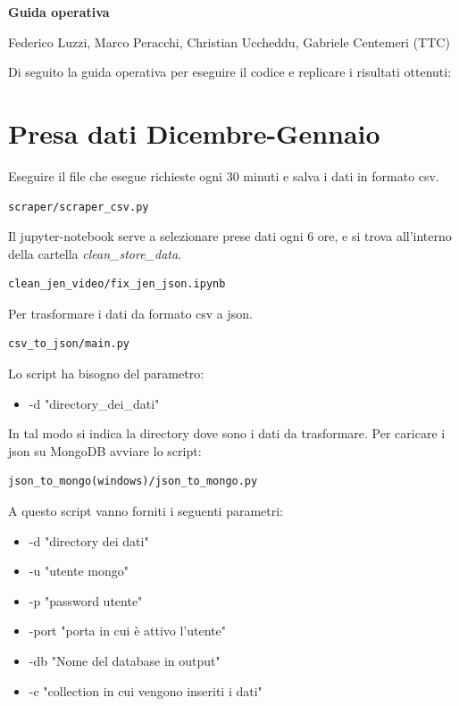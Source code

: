 \documentclass[10pt, a4paper,openany]{article}
\begin{document}
\begin{center}
\large\textbf{Guida operativa}
\end{center}

\begin{center}
 Federico Luzzi,  Marco Peracchi, Christian Uccheddu, Gabriele Centemeri (TTC)
\end{center}
Di seguito la guida operativa per eseguire il codice e replicare i risultati ottenuti:

\section*{Presa dati Dicembre-Gennaio}

Eseguire il file che esegue richieste ogni 30 minuti e salva i dati in formato csv. 

\begin{verbatim}
scraper/scraper_csv.py
\end{verbatim}

Il jupyter-notebook serve a selezionare prese dati ogni 6 ore, e si trova all'interno della cartella \textit{clean\_store\_data}.

\begin{verbatim}
clean_jen_video/fix_jen_json.ipynb
\end{verbatim}

Per trasformare i dati da formato csv a json.

\begin{verbatim}
csv_to_json/main.py
\end{verbatim}

Lo script ha bisogno del parametro:

\begin{itemize}
	\item -d "directory\_dei\_dati"
\end{itemize}

In tal modo si indica la directory dove sono i dati da trasformare.
Per caricare i json su MongoDB avviare lo script:

\begin{verbatim}
json_to_mongo(windows)/json_to_mongo.py
\end{verbatim}

A questo script vanno forniti i seguenti parametri:

\begin{itemize}
	\item -d "directory dei dati"
	\item -u "utente mongo"
	\item -p "password utente"
	\item -port "porta in cui è attivo l'utente"
	\item-db "Nome del database in output"
	\item -c "collection in cui vengono inseriti i dati"
\end{itemize}
\end{document}
